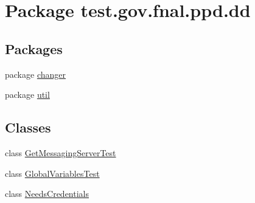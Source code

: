 \hypertarget{namespacetest_1_1gov_1_1fnal_1_1ppd_1_1dd}{\section{Package test.\-gov.\-fnal.\-ppd.\-dd}
\label{namespacetest_1_1gov_1_1fnal_1_1ppd_1_1dd}
}
\subsection*{Packages}
\begin{DoxyCompactItemize}
\item 
package \hyperlink{namespacetest_1_1gov_1_1fnal_1_1ppd_1_1dd_1_1changer}{changer}
\item 
package \hyperlink{namespacetest_1_1gov_1_1fnal_1_1ppd_1_1dd_1_1util}{util}
\end{DoxyCompactItemize}
\subsection*{Classes}
\begin{DoxyCompactItemize}
\item 
class \hyperlink{classtest_1_1gov_1_1fnal_1_1ppd_1_1dd_1_1GetMessagingServerTest}{Get\-Messaging\-Server\-Test}
\item 
class \hyperlink{classtest_1_1gov_1_1fnal_1_1ppd_1_1dd_1_1GlobalVariablesTest}{Global\-Variables\-Test}
\item 
class \hyperlink{classtest_1_1gov_1_1fnal_1_1ppd_1_1dd_1_1NeedsCredentials}{Needs\-Credentials}
\end{DoxyCompactItemize}
